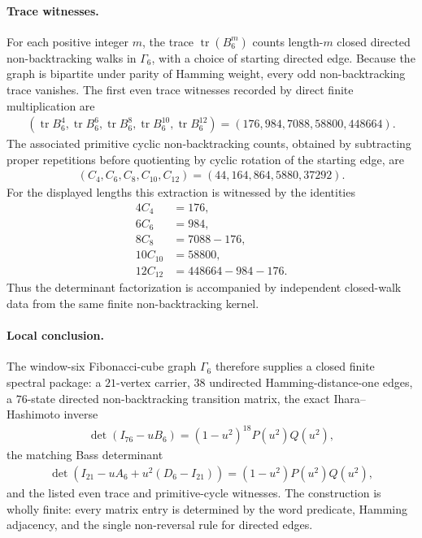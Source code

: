 \paragraph{Trace witnesses.}
For each positive integer $m$, the trace $\operatorname{tr}(B_6^m)$ counts length-$m$ closed directed non-backtracking walks in $\Gamma_6$, with a choice of starting directed edge. Because the graph is bipartite under parity of Hamming weight, every odd non-backtracking trace vanishes. The first even trace witnesses recorded by direct finite multiplication are
$$
\begin{aligned}
(\operatorname{tr}B_6^4,\operatorname{tr}B_6^6,\operatorname{tr}B_6^8,\operatorname{tr}B_6^{10},\operatorname{tr}B_6^{12})
=(176,984,7088,58800,448664).
\end{aligned}
$$
The associated primitive cyclic non-backtracking counts, obtained by subtracting proper repetitions before quotienting by cyclic rotation of the starting edge, are
$$
\begin{aligned}
(C_4,C_6,C_8,C_{10},C_{12})=(44,164,864,5880,37292).
\end{aligned}
$$
For the displayed lengths this extraction is witnessed by the identities
$$
\begin{aligned}
4C_4&=176,\\
6C_6&=984,\\
8C_8&=7088-176,\\
10C_{10}&=58800,\\
12C_{12}&=448664-984-176.
\end{aligned}
$$
Thus the determinant factorization is accompanied by independent closed-walk data from the same finite non-backtracking kernel.

\paragraph{Local conclusion.}
The window-six Fibonacci-cube graph $\Gamma_6$ therefore supplies a closed finite spectral package: a $21$-vertex carrier, $38$ undirected Hamming-distance-one edges, a $76$-state directed non-backtracking transition matrix, the exact Ihara--Hashimoto inverse
$$
\begin{aligned}
\det(I_{76}-uB_6)=(1-u^2)^{18}P(u^2)Q(u^2),
\end{aligned}
$$
the matching Bass determinant
$$
\begin{aligned}
\det(I_{21}-uA_6+u^2(D_6-I_{21}))=(1-u^2)P(u^2)Q(u^2),
\end{aligned}
$$
and the listed even trace and primitive-cycle witnesses. The construction is wholly finite: every matrix entry is determined by the word predicate, Hamming adjacency, and the single non-reversal rule for directed edges.

